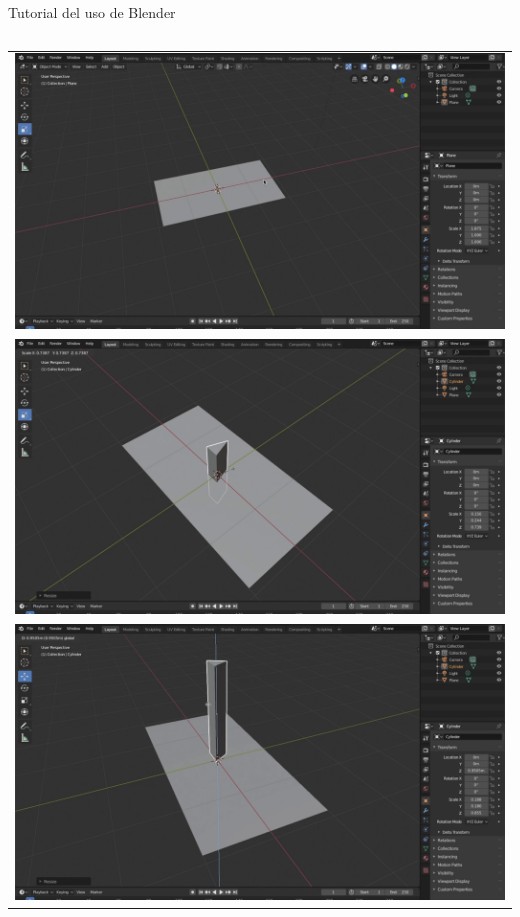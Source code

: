 \begin{frame}{Tutorial del uso de Blender \footnotemark}
\begin{columns}
\begin{column}{0.23\textwidth}
    \begin{center}
	    \begin{tabular}{c}
		        \includegraphics[width=0.75\linewidth]{Figs/VideoBlender01}\\
		        \includegraphics[width=0.75\linewidth]{Figs/VideoBlender02}\\
                \includegraphics[width=0.75\linewidth]{Figs/VideoBlender03}\\
	    \end{tabular}
    \end{center}
\end{column}

\end{columns}
\end{frame}
